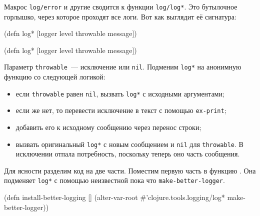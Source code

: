 
Макрос \verb|log/error| и другие сводится к функции \verb|log/log*|. Это
бутылочное горлышко, через которое проходят все логи. Вот как выглядит её
сигнатура:

\ifnarrow

\begin{english}
  \begin{clojure}
(defn log*
  [logger level throwable message])
  \end{clojure}
\end{english}

\else

\begin{english}
  \begin{clojure}
(defn log* [logger level throwable message])
  \end{clojure}
\end{english}

\fi

Параметр \verb|throwable|~--- исключение или \verb|nil|. Подменим \verb|log*| на
анонимную функцию со следующей логикой:

\begin{itemize}

\item
  если \verb|throwable| равен \verb|nil|, вызвать \verb|log*| с исходными
  аргументами;

\item
  если же нет, то перевести исключение в текст с помощью \verb|ex-print|;

\item
  добавить его к исходному сообщению через перенос строки;

\item
  вызвать оригинальный \verb|log*| с новым сообщением и \verb|nil| для
  \verb|throwable|. В исключении отпала потребность, поскольку теперь оно
  часть сообщения.

\end{itemize}

Для ясности разделим код на две части. Поместим первую часть в функцию
. Она подменяет \verb|log*| с помощью неизвестной
пока что \texttt{make-better-logger}.

\begin{english}
  \begin{clojure}
(defn install-better-logging []
  (alter-var-root
   #'clojure.tools.logging/log*
   make-better-logger))
  \end{clojure}
\end{english}

